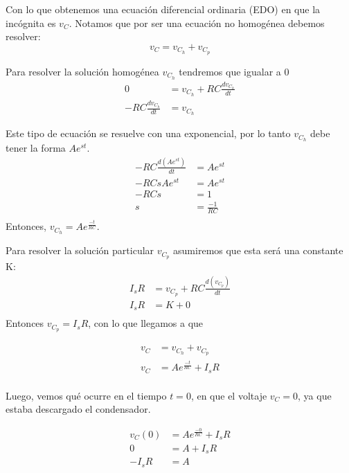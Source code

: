 \begin{example}
Con lo que obtenemos una ecuación diferencial ordinaria (EDO) en que la incógnita es $v_C$. Notamos que por ser una ecuación no homogénea debemos resolver:
\begin{equation*}
    v_C=v_{C_h}+ v_{C_p}
\end{equation*}

Para resolver la solución homogénea $v_{C_h}$ tendremos que igualar a 0
\begin{align*}
    0                      & = v_{C_h} +  RC\frac{dv_{C_h}}{dt} \\
    -RC\frac{dv_{C_h}}{dt} & = v_{C_h}
\end{align*}

Este tipo de ecuación se resuelve con una exponencial, por lo tanto $v_{C_h}$ debe tener la forma $Ae^{st}$.
\begin{align*}
    -RC\frac{d(Ae^{st})}{dt} & = Ae^{st}       \\
    -RCsAe^{st}              & = Ae^{st}       \\
    -RCs                     & = 1             \\
    s                        & = \frac{-1}{RC} \\
\end{align*}
Entonces, $v_{C_h}=Ae^{\frac{-t}{RC}}$.

Para resolver la solución particular $v_{C_p}$ asumiremos que esta será una constante K:
\begin{align*}
    I_sR & = v_{C_p} +  RC\frac{d(v_{C_p})}{dt} \\
    I_sR & = K + 0                              \\
\end{align*}
Entonces  $v_{C_p}=I_sR$, con lo que llegamos a que

\begin{align*}
    v_C & =v_{C_h}+ v_{C_p}         \\
    v_C & =Ae^{\frac{-t}{RC}}+ I_sR \\
\end{align*}

Luego, vemos qué ocurre en el tiempo $t=0$, en que el voltaje $v_C=0$, ya que estaba descargado el condensador.

\begin{align*}
    v_C(0) & =Ae^{\frac{-0}{RC}}+ I_sR \\
    0      & =A+ I_sR                  \\
    -I_sR  & =A                        \\
\end{align*}


\end{example}
